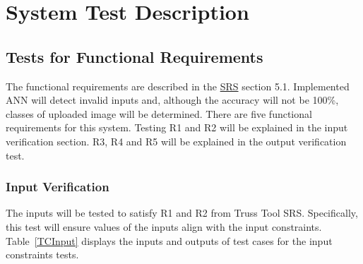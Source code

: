 \documentclass[12pt, titlepage]{article}
\begin{document}


\section{System Test Description}\label{SystemTest}
	
\subsection{Tests for Functional Requirements}

The functional requirements are described in the 
\href{https://github.com/tanya-jp/ANN-CAS741/blob/main/docs/SRS/SRS.pdf}{SRS} section 5.1. 
Implemented ANN will detect invalid inputs and, although the accuracy will not be 100\%,
classes of uploaded image will be determined. There are five functional requirements for
this system. Testing R1 and R2 will be explained in 
the input verification section. R3, R4 and R5 will be
explained in the output verification test.



\subsubsection{Input Verification}

The inputs will be tested to satisfy R1 and R2 from Truss Tool SRS. Specifically,
this test will ensure values of the inputs align with the input constraints.
Table~\ref{TCInput} displays the inputs and outputs of test cases for the input constraints
tests.
		
\end{document}

